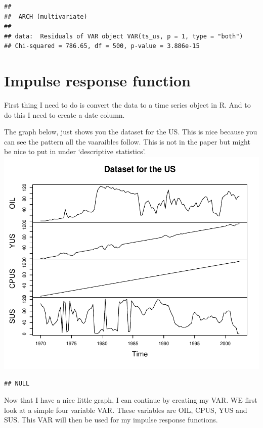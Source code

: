 \documentclass[11pt,preprint, authoryear]{elsarticle}
\numberwithin{equation}{section}
\numberwithin{figure}{section}
\numberwithin{table}{section}
\begin{document}
\begin{verbatim}
## 
##  ARCH (multivariate)
## 
## data:  Residuals of VAR object VAR(ts_us, p = 1, type = "both")
## Chi-squared = 786.65, df = 500, p-value = 3.886e-15
\end{verbatim}

\hypertarget{impulse-response-function}{%
\section{Impulse response function}\label{impulse-response-function}}

First thing I need to do is convert the data to a time series object in
R. And to do this I need to create a date column.

The graph below, just shows you the dataset for the US. This is nice
because you can see the pattern all the vaaraibles follow. This is not
in the paper but might be nice to put in under `descriptive statistics'.
\includegraphics{replication_files/figure-latex/unnamed-chunk-5-1.pdf}

\begin{verbatim}
## NULL
\end{verbatim}

Now that I have a nice little graph, I can continue by creating my VAR.
WE first look at a simple four variable VAR. These variables are OIL,
CPUS, YUS and SUS. This VAR will then be used for my impulse response
functions.
\end{document}
